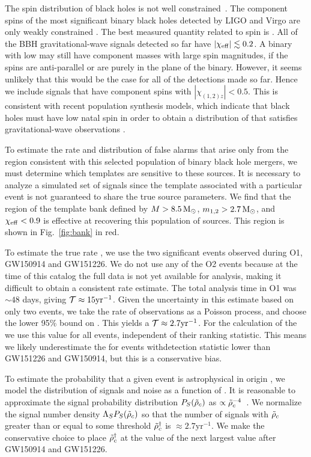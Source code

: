 The spin distribution of black holes is not well constrained~\citep{Reynolds:2013qqa}. The component spins
of the most significant binary black holes detected by LIGO and Virgo are
only weakly constrained \citep{TheLIGOScientific:2016pea}. The best measured
quantity related to spin is \chieff{}. All of the BBH gravitational-wave signals
detected so far have $|\chi_{\mathrm{eff}}| \lesssim 0.2$. A binary with
low \chieff{} may still have component masses with large spin magnitudes,
if the spins are anti-parallel or are purely in the plane of the binary.
However, it seems unlikely that this would be the case for all of the
detections made so far. Hence we include signals that have
component spins with $|\chi_{(1,2)z}| < 0.5$. This is consistent with
recent population synthesis models, which indicate that black holes
must have low natal spin in order to obtain a distribution of \chieff{}
that satisfies gravitational-wave observations \citep{Belczynski:2017gds,Wysocki:2017isg}.

To estimate the rate and distribution of false alarms that arise only
from the region consistent with this selected population of
binary black hole mergers, we must determine which templates are sensitive to these sources.
It is necessary to analyze a simulated set of signals since
the template associated with a particular event is not guaranteed to share the 
true source parameters. We find that the region of the template bank defined by
$M > 8.5\,\mathrm{M}_{\odot}$, $m_{1,2} > 2.7\,\mathrm{M}_{\odot}$, and $\chi_{\mathrm{eff}} < 0.9$ is effective at recovering
this population of sources. This region is shown in Fig.~\ref{fig:bank} in red. 

To estimate the true rate \tar{}, we use the two significant events observed
during O1, GW150914 and GW151226. We do not use any of the O2 events because at the time of this catalog the full data is
not yet available for analysis, making it difficult to obtain a consistent rate estimate. The total analysis time in O1 was $\sim48$ days, giving $\mathcal{T} \approx 15 \mathrm{yr}^{-1}$. Given the uncertainty in
this estimate based on only two events, we take the rate of observations as a Poisson process, and choose the lower
95\% bound on \tar{}. This yields a $\mathcal{T} \approx 2.7 \mathrm{yr}^{-1}$. For the calculation
of the \tdr{} we use this value for all events, independent of their ranking statistic. This means we likely underestimate the \tdr{} for events withdetection statistic lower than GW151226 and GW150914, but this is a conservative bias.

To estimate the probability that a given event is astrophysical in origin \pastro{}, we model
the distribution of signals and noise as a function of \rankingstat. It is reasonable to approximate the signal
probability distribution $P_S(\tilde{\rho}_c)$ as $\propto \tilde{\rho}_c^{-4}$~\citep{Schutz:2011tw,Chen:2014yla}.
We normalize the signal number density $\Lambda_S P_S(\tilde{\rho}_c)$ so that the number of signals
with $\tilde{\rho}_c$ greater than or equal to some threshold
$\tilde{\rho}_c^{\dagger}$ is $\approx 2.7 \mathrm{yr}^{-1}$. We make the conservative choice to place
$\tilde{\rho}_c^{\dagger}$ at the value of the next largest \rankingstat{} value after GW150914 and GW151226. 

